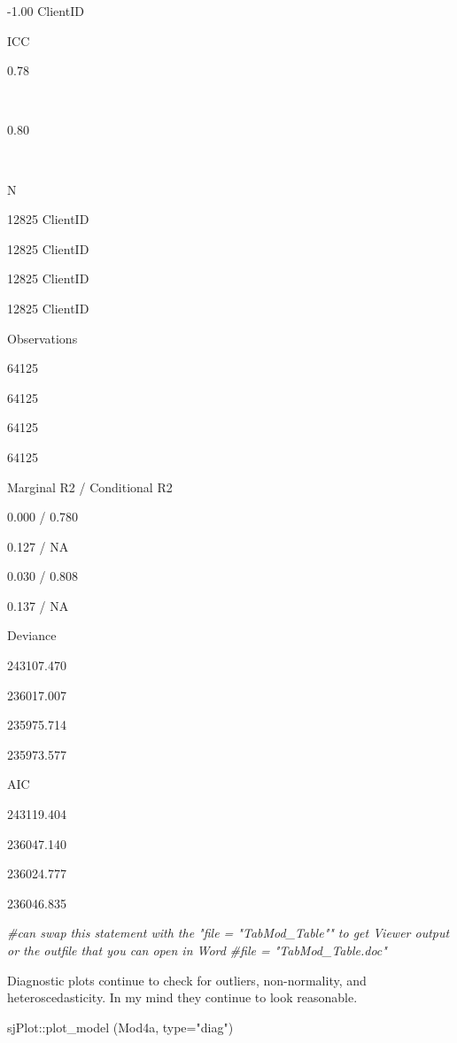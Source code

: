 \documentclass[
  11pt,
]{book}
\newenvironment{Shaded}{\begin{snugshade}}{\end{snugshade}}
\newcommand{\AttributeTok}[1]{\textcolor[rgb]{0.77,0.63,0.00}{#1}}
\newcommand{\CommentTok}[1]{\textcolor[rgb]{0.56,0.35,0.01}{\textit{#1}}}
\newcommand{\FunctionTok}[1]{\textcolor[rgb]{0.00,0.00,0.00}{#1}}
\newcommand{\NormalTok}[1]{#1}
\newcommand{\SpecialCharTok}[1]{\textcolor[rgb]{0.00,0.00,0.00}{#1}}
\newcommand{\StringTok}[1]{\textcolor[rgb]{0.31,0.60,0.02}{#1}}
\begin{document}
-1.00 ClientID

ICC

0.78

~

0.80

~

N

12825 ClientID

12825 ClientID

12825 ClientID

12825 ClientID

Observations

64125

64125

64125

64125

Marginal R2 / Conditional R2

0.000 / 0.780

0.127 / NA

0.030 / 0.808

0.137 / NA

Deviance

243107.470

236017.007

235975.714

235973.577

AIC

243119.404

236047.140

236024.777

236046.835

\begin{Shaded}
\begin{Highlighting}[]
\CommentTok{\#can swap this statement with the "file = "TabMod\_Table"" to get Viewer output or the outfile that you can open in Word}
\CommentTok{\#file = "TabMod\_Table.doc"}
\end{Highlighting}
\end{Shaded}

Diagnostic plots continue to check for outliers, non-normality, and heteroscedasticity. In my mind they continue to look reasonable.

\begin{Shaded}
\begin{Highlighting}[]
\NormalTok{sjPlot}\SpecialCharTok{::}\FunctionTok{plot\_model}\NormalTok{ (Mod4a, }\AttributeTok{type=}\StringTok{"diag"}\NormalTok{)}
\end{Highlighting}
\end{Shaded}
\end{document}
